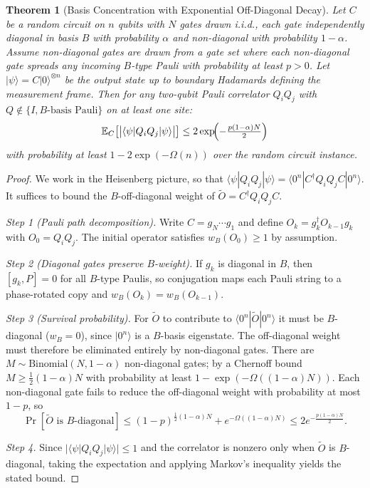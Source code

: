\documentclass[conference]{IEEEtran}
\newtheorem{theorem}{Theorem}
\newcommand{\nqubits}{n}
\begin{document}
\begin{theorem}[Basis Concentration with Exponential Off-Diagonal Decay]
\label{thm:concentration}
Let $C$ be a random circuit on $\nqubits$ qubits with $N$ gates drawn i.i.d., each gate independently diagonal in basis $B$ with probability $\alpha$ and non-diagonal with probability $1 - \alpha$. Assume non-diagonal gates are drawn from a gate set where each non-diagonal gate spreads any incoming $B$-type Pauli with probability at least $p > 0$. Let $|\psi\rangle = C|0\rangle^{\otimes \nqubits}$ be the output state up to boundary Hadamards defining the measurement frame. Then for any two-qubit Pauli correlator $Q_i Q_j$ with $Q \notin \{I, B\text{-basis Pauli}\}$ on at least one site:
\[
\mathbb{E}_C\!\left[\bigl|\langle \psi | Q_i Q_j | \psi \rangle\bigr|\right] \leq 2\exp\!\Bigl(-\tfrac{p(1-\alpha)N}{2}\Bigr)
\]
with probability at least $1 - 2\exp(-\Omega(n))$ over the random circuit instance.
\end{theorem}

\begin{proof}
We work in the Heisenberg picture, so that $\langle \psi | Q_i Q_j | \psi \rangle = \langle 0^n | C^\dagger Q_i Q_j C | 0^n \rangle$. It suffices to bound the $B$-off-diagonal weight of $\tilde{O} = C^\dagger Q_i Q_j C$.

\textit{Step 1 (Pauli path decomposition).} Write $C = g_N \cdots g_1$ and define $O_k = g_k^\dagger O_{k-1} g_k$ with $O_0 = Q_i Q_j$. The initial operator satisfies $w_B(O_0) \geq 1$ by assumption.

\textit{Step 2 (Diagonal gates preserve $B$-weight).} If $g_k$ is diagonal in $B$, then $[g_k, P] = 0$ for all $B$-type Paulis, so conjugation maps each Pauli string to a phase-rotated copy and $w_B(O_k) = w_B(O_{k-1})$.

\textit{Step 3 (Survival probability).} For $\tilde{O}$ to contribute to $\langle 0^n|\tilde{O}|0^n\rangle$ it must be $B$-diagonal ($w_B = 0$), since $|0^n\rangle$ is a $B$-basis eigenstate. The off-diagonal weight must therefore be eliminated entirely by non-diagonal gates. There are $M \sim \mathrm{Binomial}(N, 1-\alpha)$ non-diagonal gates; by a Chernoff bound $M \geq \frac{1}{2}(1-\alpha)N$ with probability at least $1 - \exp(-\Omega((1-\alpha)N))$. Each non-diagonal gate fails to reduce the off-diagonal weight with probability at most $1-p$, so
\[
\Pr[\tilde{O} \text{ is } B\text{-diagonal}] \leq (1-p)^{\frac{1}{2}(1-\alpha)N} + e^{-\Omega((1-\alpha)N)} \leq 2e^{-\frac{p(1-\alpha)N}{2}}.
\]

\textit{Step 4.} Since $|\langle \psi|Q_iQ_j|\psi\rangle| \leq 1$ and the correlator is nonzero only when $\tilde{O}$ is $B$-diagonal, taking the expectation and applying Markov's inequality yields the stated bound.
\end{proof}
\end{document}
